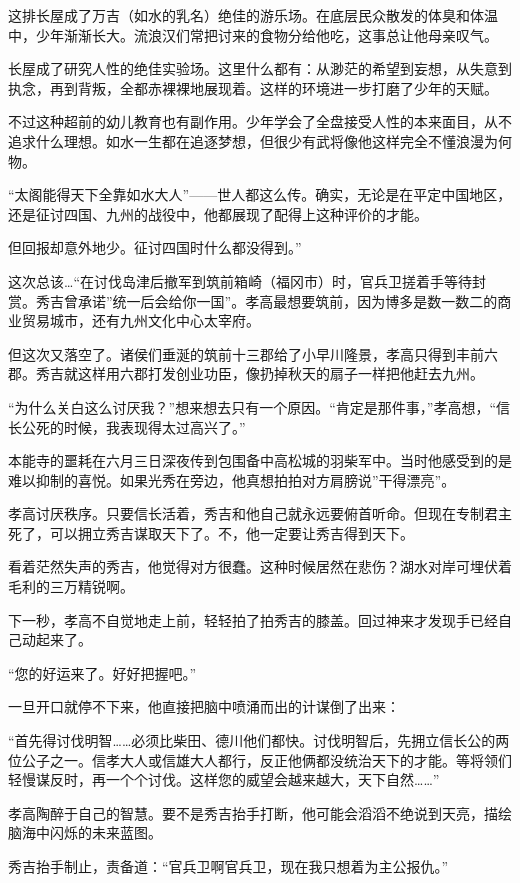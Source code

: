 \documentclass[
]{book}
\begin{document}
这排长屋成了万吉（如水的乳名）绝佳的游乐场。在底层民众散发的体臭和体温中，少年渐渐长大。流浪汉们常把讨来的食物分给他吃，这事总让他母亲叹气。

长屋成了研究人性的绝佳实验场。这里什么都有：从渺茫的希望到妄想，从失意到执念，再到背叛，全都赤裸裸地展现着。这样的环境进一步打磨了少年的天赋。

不过这种超前的幼儿教育也有副作用。少年学会了全盘接受人性的本来面目，从不追求什么理想。如水一生都在追逐梦想，但很少有武将像他这样完全不懂浪漫为何物。

``太阁能得天下全靠如水大人''------世人都这么传。确实，无论是在平定中国地区，还是征讨四国、九州的战役中，他都展现了配得上这种评价的才能。

但回报却意外地少。征讨四国时什么都没得到。''

这次总该\ldots{}``在讨伐岛津后撤军到筑前箱崎（福冈市）时，官兵卫搓着手等待封赏。秀吉曾承诺''统一后会给你一国''。孝高最想要筑前，因为博多是数一数二的商业贸易城市，还有九州文化中心太宰府。

但这次又落空了。诸侯们垂涎的筑前十三郡给了小早川隆景，孝高只得到丰前六郡。秀吉就这样用六郡打发创业功臣，像扔掉秋天的扇子一样把他赶去九州。

``为什么关白这么讨厌我？''想来想去只有一个原因。``肯定是那件事，''孝高想，``信长公死的时候，我表现得太过高兴了。''

本能寺的噩耗在六月三日深夜传到包围备中高松城的羽柴军中。当时他感受到的是难以抑制的喜悦。如果光秀在旁边，他真想拍拍对方肩膀说''干得漂亮''。

孝高讨厌秩序。只要信长活着，秀吉和他自己就永远要俯首听命。但现在专制君主死了，可以拥立秀吉谋取天下了。不，他一定要让秀吉得到天下。

看着茫然失声的秀吉，他觉得对方很蠢。这种时候居然在悲伤？湖水对岸可埋伏着毛利的三万精锐啊。

下一秒，孝高不自觉地走上前，轻轻拍了拍秀吉的膝盖。回过神来才发现手已经自己动起来了。

``您的好运来了。好好把握吧。''

一旦开口就停不下来，他直接把脑中喷涌而出的计谋倒了出来：

``首先得讨伐明智\ldots\ldots 必须比柴田、德川他们都快。讨伐明智后，先拥立信长公的两位公子之一。信孝大人或信雄大人都行，反正他俩都没统治天下的才能。等将领们轻慢谋反时，再一个个讨伐。这样您的威望会越来越大，天下自然\ldots\ldots{}''

孝高陶醉于自己的智慧。要不是秀吉抬手打断，他可能会滔滔不绝说到天亮，描绘脑海中闪烁的未来蓝图。

秀吉抬手制止，责备道：``官兵卫啊官兵卫，现在我只想着为主公报仇。''
\end{document}
